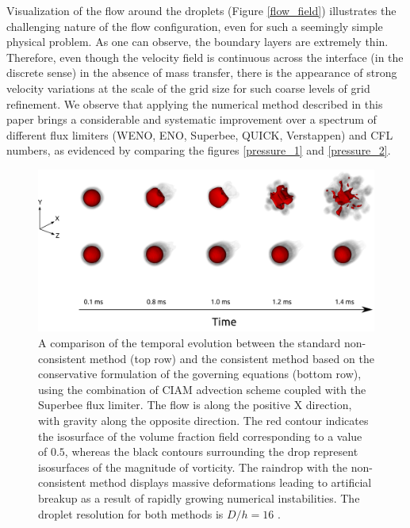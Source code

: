 Visualization of the flow around the droplets (Figure \ref{flow_field}) 
illustrates the challenging nature of the flow configuration, 
even for such a seemingly simple physical problem. 
As one can observe, the boundary layers are extremely thin. 
Therefore, even though the velocity field is continuous across the 
interface (in the discrete sense) in the absence of mass transfer, 
there is the appearance of strong velocity variations at the 
scale of the grid size for such coarse levels of grid refinement. 
We observe that applying the numerical method described in this 
paper brings a considerable and systematic improvement over a 
spectrum of different flux limiters (WENO, ENO, Superbee, QUICK, Verstappen) 
and CFL numbers, as evidenced by comparing the figures \ref{pressure_1} and \ref{pressure_2}. 

\begin{figure}
\begin{center}
\includegraphics[width=1.25\textwidth]{plots/raindrop/raindrop_explode.png}
\end{center}
\caption{A comparison of the temporal evolution between the standard 
non-consistent method (top row) and the consistent method based on the 
conservative formulation of the governing equations (bottom row), 
using the combination of CIAM advection scheme coupled with the Superbee flux limiter. 
The flow is along the positive X direction, with gravity along the opposite direction. 
The red contour indicates the isosurface of the volume fraction 
field corresponding to a value of $0.5$, whereas the black contours 
surrounding the drop represent isosurfaces of the magnitude of vorticity. 
The raindrop with the non-consistent method displays massive deformations 
leading to artificial breakup as a result of rapidly growing numerical instabilities. 
The droplet resolution for both methods is $D/h = 16$ .}
\label{explode_compare}
\end{figure}


